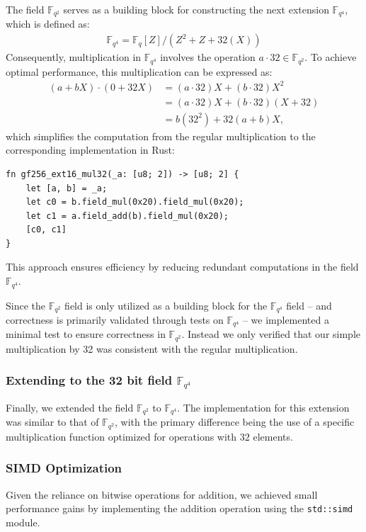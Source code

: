 \documentclass[11pt]{report}
\theoremstyle{definition}
\theoremstyle{plain}
\newcommand{\todo}[1]{{\color[rgb]{.5,0,0}\textbf{$\blacktriangleright$#1$\blacktriangleleft$}}}
\begin{document}
The field $\mathbb{F}_{q^2}$ serves as a building block for constructing the next extension $\mathbb{F}_{q^4}$, which is defined as:
\begin{align}
  \mathbb{F}_{q^4} = \mathbb{F}_q[Z] / (Z^2 + Z + 32(X))\label{eq:fq4}
\end{align}
Consequently, multiplication in $\mathbb{F}_{q^4}$ involves the operation $a \cdot 32 \in \mathbb{F}_{q^2}$.
To achieve optimal performance, this multiplication can be expressed as:
\begin{align*}
  (a + bX) \cdot (0 + 32X) & = (a \cdot 32)X + (b \cdot 32)X^2      \\
                           & = (a \cdot 32)X + (b \cdot 32)(X + 32) \\
                           & = b(32^2) + 32(a + b)X,
\end{align*}
which simplifies the computation from the regular multiplication to the corresponding implementation in Rust:
\begin{verbatim}
fn gf256_ext16_mul32(_a: [u8; 2]) -> [u8; 2] {
    let [a, b] = _a;
    let c0 = b.field_mul(0x20).field_mul(0x20);
    let c1 = a.field_add(b).field_mul(0x20);
    [c0, c1]
}
\end{verbatim}

\noindent This approach ensures efficiency by reducing redundant computations in the field $\mathbb{F}_{q^4}$.

Since the $\mathbb{F}_{q^2}$ field is only utilized as a building block for the $\mathbb{F}_{q^4}$ field -- and correctness is primarily validated through tests on $\mathbb{F}_{q^4}$ -- we implemented a minimal test to ensure correctness in $\mathbb{F}_{q^2}$. Instead we only verified that our simple multiplication by 32 was consistent with the regular multiplication.

\subsubsection{Extending to the 32 bit field $\mathbb{F}_{q^4}$}\label{sec:gf_256_32_bit_field}
Finally, we extended the field $\mathbb{F}_{q^2}$ to $\mathbb{F}_{q^4}$. The implementation for this extension was similar to that of $\mathbb{F}_{q^2}$, with the primary difference being the use of a specific multiplication function optimized for operations with $32$ elements.

\subsubsection{SIMD Optimization}
Given the reliance on bitwise operations for addition, we achieved small performance gains by implementing the addition operation using the \texttt{std::simd} module. 
\end{document}
